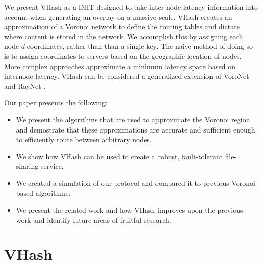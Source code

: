 \documentclass{IEEEtran}
\begin{document}
 

We present VHash as a DHT designed to take inter-node latency information into account when generating an overlay on a massive scale.  VHash creates an approximation of a Voronoi network to define the routing tables and dictate where content is stored in the network.  We accomplish this by assigning each node $d$ coordinates, rather than than a single key.  The naive method of doing so is to assign coordinates to servers based on the geographic location of nodes. More complex approaches approximate a minimum latency space based on internode latency. VHash can be considered  a generalized extension of VoroNet \cite{voronet} and  RayNet \cite{raynet}.



 

Our paper presents the following:
\begin{itemize}
	\item We present the algorithms that are used to approximate the Voronoi region and demostrate that these approximations are accurate and sufficient enough to efficiently route between arbitrary nodes.
	\item We show how VHash can be used to create a robust, fault-tolerant file-sharing service.
	\item We created a simulation of our protocol and compared it to previous Voronoi based algorithms.
	\item We present the related work and how VHash improves upon the previous work and identify future areas of fruitful research.
\end{itemize}


\section{VHash}
\end{document}
